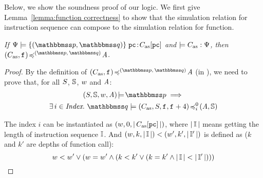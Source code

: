 {\color{blue}
Below, we show the soundness proof of our logic.
We first give Lemma~\ref{lemma:function correctness}
to show that the simulation relation for instruction
sequence can compose to the simulation relation for
function.
\begin{lemma}
    \label{lemma:function correctness}
    \em
    If $\semwffseqrel{\Cspec{}}{\relastP}{\relastQ}
            {\pc}{\asmimp[\pc]}$ and
    $\models C_{\text{as}}:\Psi{}$, then
    $\simFunction{(\asmimp, \lab{})}
        {(\relastP, \, \relastQ)}{\primcom}$.
\end{lemma}
\begin{proof}
    By the definition of
    $\simFunction{(\asmimp, \lab{})}
        {(\relastP, \, \relastQ)}{\primcom}$
    (in \Def{\ref{def:simfunc}}),
    we need to prove that, for all $S$, $\mathbb{S}$,
    $w$ and $\textit{A}$:
    \begin{multline*}
        \asrtmodel{(\state, \hpstate, \word, \primcom)}
            {\relastP} \implies \\
            \exists \, i \in \Index. \
            \simFunctionSt{\relastQ}{(\asmimp, \state, \lab{}, \lab{}+4)}
                {i}{0}{(\primcom, \hpstate)}
    \end{multline*}

    The index $i$ can be instantiated as 
    $(w, 0, |\,C_{\text{as}}[\texttt{pc}]\,|)$, where $|\,\mathbb{I}\,|$ means
    getting the length of instruction sequence $\mathbb{I}$.
    And $(w, k, |\, \mathbb{I} \,|) < (w', k', |\,\mathbb{I}'\,|)$
    is defined as ($k$ and $k'$ are depths of function call):
    \[
        w < w' \lor 
        (w = w' \land 
        (k < k' \lor (k = k' \land 
        |\,\mathbb{I}\,| < |\,\mathbb{I}'\,|)))
    \]


\end{proof}}
